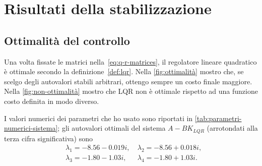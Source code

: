 \section{Risultati della stabilizzazione}



\subsection{Ottimalità del controllo}
Una volta fissate le matrici nella~\eqref{eq:q-r-matrices},
il regolatore lineare quadratico è ottimale secondo la
definizione~\ref{def:lqr}.
Nella \autoref{fig:ottimalità} mostro che, se scelgo degli autovalori
stabili arbitrari, ottengo sempre un costo finale maggiore.
Nella \autoref{fig:non-ottimalità} mostro che LQR non è
ottimale rispetto ad una funzione costo definita in modo diverso.

I valori numerici dei parametri che ho usato
sono riportati in \autoref{tab:parametri-numerici-sistema};
gli autovalori ottimali del sistema $A - BK_{LQR}$ (arrotondati alla terza cifra significativa) sono
\begin{equation}
    \left.
        \begin{aligned}
        &\lambda_1 = -8.56 - 0.019i, \
        &\lambda_2 = -8.56 + 0.018i, \\
        &\lambda_3 = -1.80 - 1.03i, \
        &\lambda_4 = -1.80 + 1.03i.
        \end{aligned}
    \right.
    \label{eq:lqr-eigenvalues}
\end{equation}

